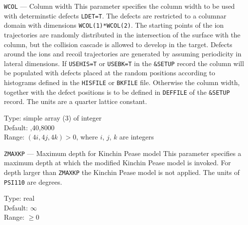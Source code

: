 \ifprivate
\begin{keydescription}{\texttt{WCOL} --- Column width}
%
  This parameter specifies the column width to be used with
  determinstic defects \texttt{LDET=T}. The defects are restricted to a
  columnar domain with dimensions \texttt{WCOL(1)*WCOL(2)}. The starting
  points of the ion trajectories are randomly distributed in the intersection
  of the surface with the column, but the collision cascade is allowed to
  develop in the target. Defects around the ions and recoil trajectories are
  generated by assuming periodicity in lateral dimensions.  If
  \texttt{USEHIS=T} or \texttt{USEBK=T} in the \texttt{\&SETUP} record the
  column will be populated with defects placed at the random positions
  according to histograms defined in the \texttt{HISFILE} or \texttt{BKFILE} file.
  Otherwise the column width, together with the defect positions is to be defined
  in \texttt{DEFFILE} of the \texttt{\&SETUP} record. The units are a quarter
  lattice constant.
  \begin{keytab} 
    Type: \> simple array (3) of integer \\ 
    Default: ,40,8000 \\
    Range: \> $(4i,4j,4k)>0$, where $i$, $j$, $k$ are integers \\ 
  \end{keytab}
\end{keydescription}
\fi

\begin{keydescription}{\texttt{ZMAXKP} --- Maximum depth for Kinchin
    Pease model}
%
  This parameter specifies a maximum depth at which the modified
  Kinchin Pease model is invoked. For depth larger than
  \texttt{ZMAXKP} the Kinchin Pease model is not applied.  The units
  of \texttt{PSI110} are degrees.
  \begin{keytab}
    Type:    \> real \\
    Default: \> $\infty$ \\
    Range:   \> $\ge 0$
  \end{keytab}
\end{keydescription}

